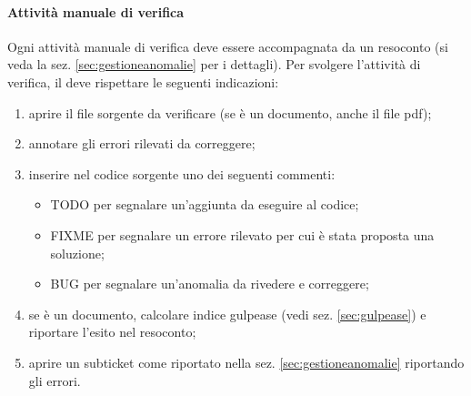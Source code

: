 	        \paragraph{Attività manuale di verifica}
	        Ogni attività manuale di verifica deve essere accompagnata da un resoconto (si veda la sez. \ref{sec:gestioneanomalie} per i dettagli). Per svolgere l'attività di verifica, il \verificatore{} deve rispettare le seguenti indicazioni:
	        \begin{enumerate}
	        	\item aprire il file sorgente da verificare (se è un documento, anche il file pdf);
	        	\item annotare gli errori rilevati da correggere;
	        	\item inserire nel codice sorgente uno dei seguenti commenti:
		        	\begin{itemize}
		        		\item TODO per segnalare un'aggiunta da eseguire al codice;
		        		\item FIXME per segnalare un errore rilevato per cui è stata proposta una soluzione;
		        		\item BUG per segnalare un'anomalia da rivedere e correggere;
		        	\end{itemize} 
	        	\item se è un documento, calcolare indice gulpease (vedi sez. \ref{sec:gulpease}) e riportare l'esito nel resoconto;
	        	\item aprire un subticket come riportato nella sez. \ref{sec:gestioneanomalie} riportando gli errori.
	        \end{enumerate}
    
